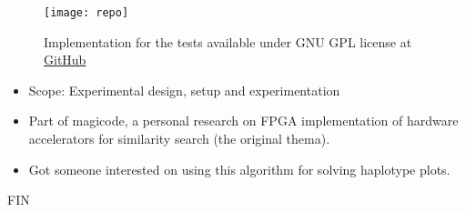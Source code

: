 \documentclass{beamer}
\begin{document}
\begin{frame}
    \centering
    \begin{figure}
        \texttt{[image: repo]}\\
        \caption{Implementation for the tests available under GNU GPL license at \href{https://github.com/KukyNekoi/magicode/tree/master/program/base_benchmark}{GitHub}}
    \end{figure}
\end{frame}


\begin{frame}
\begin{itemize}
    \item Scope: Experimental design, setup and experimentation
    \item Part of magicode, a personal research on FPGA implementation of hardware accelerators for similarity search (the original thema).
    \item Got someone interested on using this algorithm for solving haplotype plots.
\end{itemize}
\end{frame}
  
\begin{frame}
\centering
		FIN
\end{frame}
\end{document}

